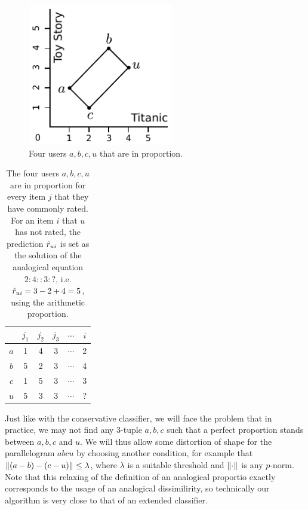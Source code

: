 \begin{figure}[!h]
\centering
  \includegraphics[width=2.5in]{figures/analogical_recommendation.pdf}
  \caption{Four users $a, b, c, u$ that are in proportion.}
\label{FIG:analogical_recommendation}
\end{figure}

\begin{table}[h!]
\centering
  \begin{tabular}{| c |  c  c  c  c  c | }
\toprule
 & $j_1$ & $j_2$ & $j_3$ & $\cdots$ & $i$\\
  \midrule
$a$ & 1 & 4  & 3 & $\cdots$ & 2 \\
$b$ & 5 & 2  & 3 & $\cdots$ & 4 \\
$c$ & 1 & 5  & 3 & $\cdots$ & 3 \\
$u$ & 5 & 3  & 3 & $\cdots$ & ? \\
\bottomrule
\end{tabular}
\caption{The four users $a, b, c, u$ are in proportion for every item $j$ that
  they have commonly rated. For an item $i$ that $u$ has not rated, the
  prediction $\hat{r}_{ui}$ is set as the solution of the analogical equation
  $2:4::3:?$, i.e. $\hat{r}_{ui} = 3 - 2 + 4 = 5$, using the arithmetic proportion.}
\label{TAB:analogical_recommendation}
\end{table}

Just like with the conservative classifier, we will face the problem that in
practice, we may not find any $3$-tuple $a, b, c$ such that a perfect
proportion stands between $a, b, c$ and $u$. We will thus allow some distortion
of shape for the parallelogram $abcu$ by choosing another condition, for
example that ${\left\lVert(a-b) - (c-u)\right\rVert}_{} \leq \lambda$, where $\lambda$ is a
suitable threshold and ${\left\lVert\cdot\right\rVert}_{}$ is any $p$-norm. Note that this
relaxing of the definition of an analogical proportio exactly corresponds to
the usage of an analogical dissimilirity, so technically our algorithm is very
close to that of an extended classifier.

